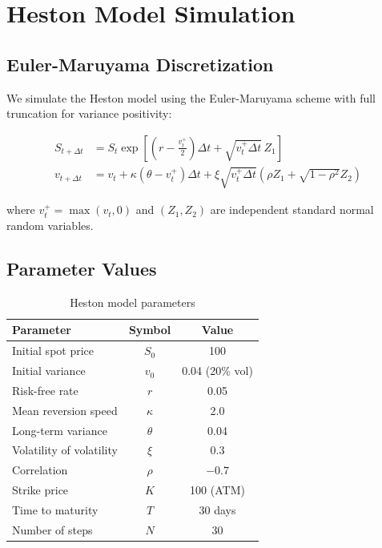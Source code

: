 
\section{Heston Model Simulation}
\label{app:heston}

\subsection{Euler-Maruyama Discretization}

We simulate the Heston model using the Euler-Maruyama scheme with full truncation for variance positivity:

\begin{align}
    S_{t+\Delta t} &= S_t \exp\left[\left(r - \frac{v_t^+}{2}\right)\Delta t + \sqrt{v_t^+ \Delta t} \, Z_1\right] \\
    v_{t+\Delta t} &= v_t + \kappa(\theta - v_t^+)\Delta t + \xi\sqrt{v_t^+ \Delta t}\left(\rho Z_1 + \sqrt{1-\rho^2} Z_2\right)
\end{align}

where $v_t^+ = \max(v_t, 0)$ and $(Z_1, Z_2)$ are independent standard normal random variables.

\subsection{Parameter Values}

\begin{table}[h]
\centering
\caption{Heston model parameters}
\begin{tabular}{lcc}
\toprule
\textbf{Parameter} & \textbf{Symbol} & \textbf{Value} \\
\midrule
Initial spot price & $S_0$ & 100 \\
Initial variance & $v_0$ & 0.04 (20\% vol) \\
Risk-free rate & $r$ & 0.05 \\
Mean reversion speed & $\kappa$ & 2.0 \\
Long-term variance & $\theta$ & 0.04 \\
Volatility of volatility & $\xi$ & 0.3 \\
Correlation & $\rho$ & $-0.7$ \\
Strike price & $K$ & 100 (ATM) \\
Time to maturity & $T$ & 30 days \\
Number of steps & $N$ & 30 \\
\bottomrule
\end{tabular}
\end{table}

